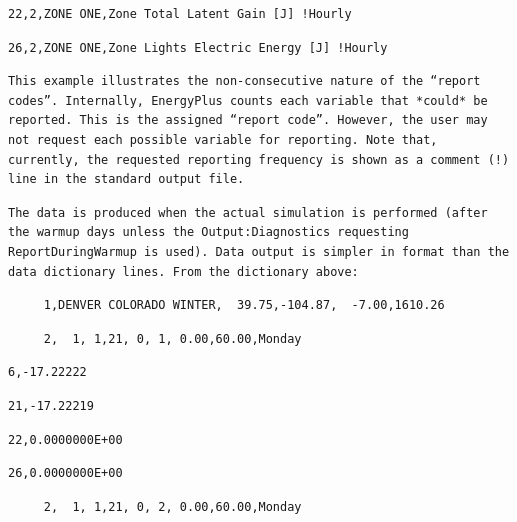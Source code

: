 \begin{lstlisting}
22,2,ZONE ONE,Zone Total Latent Gain [J] !Hourly
\end{lstlisting}

\begin{lstlisting}
26,2,ZONE ONE,Zone Lights Electric Energy [J] !Hourly
\end{lstlisting}

\begin{lstlisting}
This example illustrates the non-consecutive nature of the “report codes”. Internally, EnergyPlus counts each variable that *could* be reported. This is the assigned “report code”. However, the user may not request each possible variable for reporting. Note that, currently, the requested reporting frequency is shown as a comment (!) line in the standard output file.
\end{lstlisting}

\begin{lstlisting}
The data is produced when the actual simulation is performed (after the warmup days unless the Output:Diagnostics requesting ReportDuringWarmup is used). Data output is simpler in format than the data dictionary lines. From the dictionary above:
\end{lstlisting}

\begin{lstlisting}
     1,DENVER COLORADO WINTER,  39.75,-104.87,  -7.00,1610.26
\end{lstlisting}

\begin{lstlisting}
     2,  1, 1,21, 0, 1, 0.00,60.00,Monday
\end{lstlisting}

\begin{lstlisting}
6,-17.22222
\end{lstlisting}

\begin{lstlisting}
21,-17.22219
\end{lstlisting}

\begin{lstlisting}
22,0.0000000E+00
\end{lstlisting}

\begin{lstlisting}
26,0.0000000E+00
\end{lstlisting}

\begin{lstlisting}
     2,  1, 1,21, 0, 2, 0.00,60.00,Monday
\end{lstlisting}

